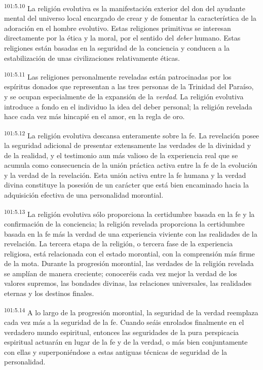 \documentclass[twoside, 11pt]{book}
\begin{document}
\par
\textsuperscript{101:5.10} La religión evolutiva es la manifestación exterior del don del ayudante mental del universo local encargado de crear y de fomentar la característica de la adoración en el hombre evolutivo. Estas religiones primitivas se interesan directamente por la ética y la moral, por el sentido del \textit{deber} humano. Estas religiones están basadas en la seguridad de la conciencia y conducen a la estabilización de unas civilizaciones relativamente éticas.

\par
\textsuperscript{101:5.11} Las religiones personalmente reveladas están patrocinadas por los espíritus donados que representan a las tres personas de la Trinidad del Paraíso, y se ocupan especialmente de la expansión de la \textit{verdad}. La religión evolutiva introduce a fondo en el individuo la idea del deber personal; la religión revelada hace cada vez más hincapié en el amor, en la regla de oro.

\par
\textsuperscript{101:5.12} La religión evolutiva descansa enteramente sobre la fe. La revelación posee la seguridad adicional de presentar extensamente las verdades de la divinidad y de la realidad, y el testimonio aun más valioso de la experiencia real que se acumula como consecuencia de la unión práctica activa entre la fe de la evolución y la verdad de la revelación. Esta unión activa entre la fe humana y la verdad divina constituye la posesión de un carácter que está bien encaminado hacia la adquisición efectiva de una personalidad morontial.

\par
\textsuperscript{101:5.13} La religión evolutiva sólo proporciona la certidumbre basada en la fe y la confirmación de la conciencia; la religión revelada proporciona la certidumbre basada en la fe más la verdad de una experiencia viviente con las realidades de la revelación. La tercera etapa de la religión, o tercera fase de la experiencia religiosa, está relacionada con el estado morontial, con la comprensión más firme de la mota. Durante la progresión morontial, las verdades de la religión revelada se amplían de manera creciente; conoceréis cada vez mejor la verdad de los valores supremos, las bondades divinas, las relaciones universales, las realidades eternas y los destinos finales.

\par
\textsuperscript{101:5.14} A lo largo de la progresión morontial, la seguridad de la verdad reemplaza cada vez más a la seguridad de la fe. Cuando seáis enrolados finalmente en el verdadero mundo espiritual, entonces las seguridades de la pura perspicacia espiritual actuarán en lugar de la fe y de la verdad, o más bien conjuntamente con ellas y superponiéndose a estas antiguas técnicas de seguridad de la personalidad.
\end{document}
